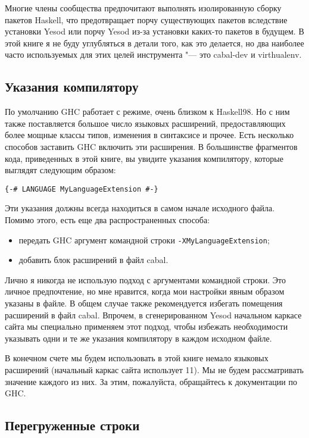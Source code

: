Многие члены сообщества предпочитают выполнять изолированную сборку пакетов Haskell, что предотвращает порчу существующих пакетов вследствие установки Yesod или порчу Yesod из-за установки каких-то пакетов в будущем. В этой книге я не буду углубляться в детали того, как это делается, но два наиболее часто используемых для этих целей инструмента "--- это cabal-dev и virthualenv.

\subsection{Указания компилятору}

По умолчанию GHC работает с режиме, очень близком к Haskell98. Но с ним также поставляется большое число языковых расширений, предоставляющих более мощные классы типов, изменения в синтаксисе и прочее. Есть несколько способов заставить GHC включить эти расширения. В большинстве фрагментов кода, приведенных в этой книге, вы увидите указания компилятору, которые выглядят следующим образом:

\begin{lstlisting}
{-# LANGUAGE MyLanguageExtension #-}
\end{lstlisting}

Эти указания должны всегда находиться в самом начале исходного файла. Помимо этого, есть еще два распространенных способа:
\begin{itemize}
\item передать GHC аргумент командной строки \lstinline'-XMyLanguageExtension';
\item добавить блок расширений в файл cabal.
\end{itemize}

Лично я никогда не использую подход с аргументами командной строки. Это личное предпочтение, но мне нравится, когда мои настройки явным образом указаны в файле. В общем случае также рекомендуется избегать помещения расширений в файл cabal. Впрочем, в сгенерированном Yesod начальном каркасе сайта мы специально применяем этот подход, чтобы избежать необходимости указывать одни и те же указания компилятору в каждом исходном файле.

В конечном счете мы будем использовать в этой книге немало языковых расширений (начальный каркас сайта использует 11). Мы не будем рассматривать значение каждого из них. За этим, пожалуйста, обращайтесь к документации по GHC.

\subsection{Перегруженные строки}

